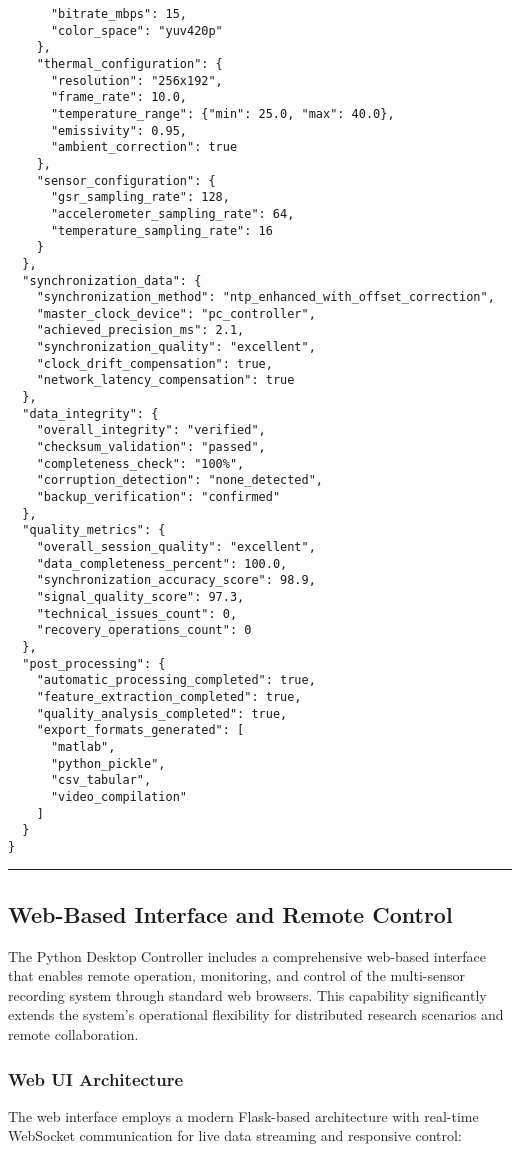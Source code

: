 \documentclass[11pt,a4paper]{article}
\begin{document}
\begin{verbatim}
      "bitrate_mbps": 15,
      "color_space": "yuv420p"
    },
    "thermal_configuration": {
      "resolution": "256x192",
      "frame_rate": 10.0,
      "temperature_range": {"min": 25.0, "max": 40.0},
      "emissivity": 0.95,
      "ambient_correction": true
    },
    "sensor_configuration": {
      "gsr_sampling_rate": 128,
      "accelerometer_sampling_rate": 64,
      "temperature_sampling_rate": 16
    }
  },
  "synchronization_data": {
    "synchronization_method": "ntp_enhanced_with_offset_correction",
    "master_clock_device": "pc_controller",
    "achieved_precision_ms": 2.1,
    "synchronization_quality": "excellent",
    "clock_drift_compensation": true,
    "network_latency_compensation": true
  },
  "data_integrity": {
    "overall_integrity": "verified",
    "checksum_validation": "passed",
    "completeness_check": "100%",
    "corruption_detection": "none_detected",
    "backup_verification": "confirmed"
  },
  "quality_metrics": {
    "overall_session_quality": "excellent",
    "data_completeness_percent": 100.0,
    "synchronization_accuracy_score": 98.9,
    "signal_quality_score": 97.3,
    "technical_issues_count": 0,
    "recovery_operations_count": 0
  },
  "post_processing": {
    "automatic_processing_completed": true,
    "feature_extraction_completed": true,
    "quality_analysis_completed": true,
    "export_formats_generated": [
      "matlab",
      "python_pickle",
      "csv_tabular",
      "video_compilation"
    ]
  }
}
\end{verbatim}

\hrule

\subsection{Web-Based Interface and Remote Control}

The Python Desktop Controller includes a comprehensive web-based interface that enables remote operation, monitoring,
and control of the multi-sensor recording system through standard web browsers. This capability significantly extends
the system's operational flexibility for distributed research scenarios and remote collaboration.

\subsubsection{Web UI Architecture}

The web interface employs a modern Flask-based architecture with real-time WebSocket communication for live data
streaming and responsive control:
\end{document}
